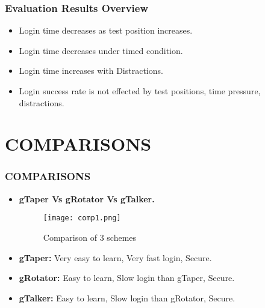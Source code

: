 \documentclass{beamer}
\begin{document}
\begin{frame}
\frametitle{Evaluation Results Overview}

\begin{itemize}
\justifying
    
    \item Login time decreases as test position increases.
    \item Login time decreases under timed condition.
    \item Login time increases with Distractions.
    \item Login success rate is not effected by test positions, time pressure, distractions.

\end{itemize}


\end{frame}

\section{COMPARISONS}
\begin{frame}
\frametitle{COMPARISONS}

\begin{itemize}
\justifying
    
    \item \textbf{gTaper Vs gRotator Vs gTalker.}
    
    \begin{figure}
    \begin{center}
        \texttt{[image: comp1.png]}
        \caption{Comparison of 3 schemes}
    \end{center}
\end{figure}
    
    \item \textbf{gTaper:} Very easy to learn, Very fast login, Secure.
    \item \textbf{gRotator:} Easy to learn, Slow login than gTaper, Secure.
    \item \textbf{gTalker:} Easy to learn, Slow login than gRotator, Secure.

\end{itemize}


\end{frame}
\end{document}
